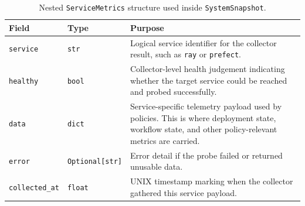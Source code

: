 \documentclass[12pt, a4paper]{report}
\begin{document}
\begin{table}[H]
  \centering
  \caption{Nested \texttt{ServiceMetrics} structure used inside \texttt{SystemSnapshot}.}
  \label{tab:servicemetrics_schema}
  \begin{tabularx}{\textwidth}{l l X}
    \toprule
    \textbf{Field} & \textbf{Type} & \textbf{Purpose} \\
    \midrule
    \texttt{service} & \texttt{str} & Logical service identifier for the collector result, such as \texttt{ray} or \texttt{prefect}. \\
    \addlinespace
    \texttt{healthy} & \texttt{bool} & Collector-level health judgement indicating whether the target service could be reached and probed successfully. \\
    \addlinespace
    \texttt{data} & \texttt{dict} & Service-specific telemetry payload used by policies. This is where deployment state, workflow state, and other policy-relevant metrics are carried. \\
    \addlinespace
    \texttt{error} & \texttt{Optional[str]} & Error detail if the probe failed or returned unusable data. \\
    \addlinespace
    \texttt{collected\_at} & \texttt{float} & UNIX timestamp marking when the collector gathered this service payload. \\
    \bottomrule
  \end{tabularx}
\end{table}
\end{document}
